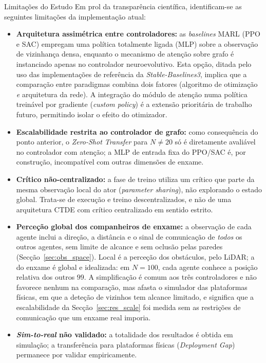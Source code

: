\documentclass[12pt,reqno, twoside]{amsbook}
\makeatletter
\def\section{\@startsection{section}{1}%
      \z@{.5\linespacing\@plus.7\linespacing}{.25\linespacing}%
      {\normalfont\bfseries\flushleft}}
\theoremstyle{plain}
\numberwithin{equation}{chapter}
\numberwithin{section}{chapter}
\numberwithin{table}{chapter}
\numberwithin{figure}{chapter}
\makeatother
\begin{document}
\section{Limitações do Estudo}
\label{sec:limitacoes}
Em prol da transparência científica, identificam-se as seguintes limitações da implementação atual:
\begin{itemize}
    \item \textbf{Arquitetura assimétrica entre controladores:} as \textit{baselines} MARL (PPO e SAC) empregam uma política totalmente ligada (MLP) sobre a observação de vizinhança densa, enquanto o mecanismo de atenção sobre grafo é instanciado apenas no controlador neuroevolutivo. Esta opção, ditada pelo uso das implementações de referência da \textit{Stable-Baselines3}, implica que a comparação entre paradigmas combina dois fatores (algoritmo de otimização \textit{e} arquitetura da rede). A integração do módulo de atenção numa política treinável por gradiente (\textit{custom policy}) é a extensão prioritária de trabalho futuro, permitindo isolar o efeito do otimizador.
    \item \textbf{Escalabilidade restrita ao controlador de grafo:} como consequência do ponto anterior, o \textit{Zero-Shot Transfer} para $N \neq 20$ só é diretamente avaliável no controlador com atenção; a MLP de entrada fixa do PPO/SAC é, por construção, incompatível com outras dimensões de enxame.
    \item \textbf{Crítico não-centralizado:} a fase de treino utiliza um crítico que parte da mesma observação local do ator (\textit{parameter sharing}), não explorando o estado global. Trata-se de execução e treino descentralizados, e não de uma arquitetura CTDE com crítico centralizado em sentido estrito.
    \item \textbf{Perceção global dos companheiros de enxame:} a observação de cada agente inclui a direção, a distância e o sinal de comunicação de \emph{todos} os outros agentes, sem limite de alcance e sem oclusão pelas paredes (Secção~\ref{sec:obs_space}). Local é a perceção dos obstáculos, pelo LiDAR; a do enxame é global e idealizada: em $N=100$, cada agente conhece a posição relativa dos outros $99$. A simplificação é comum aos três controladores e não favorece nenhum na comparação, mas afasta o simulador das plataformas físicas, em que a deteção de vizinhos tem alcance limitado, e significa que a escalabilidade da Secção~\ref{sec:res_scale} foi medida sem as restrições de comunicação que um enxame real imporia.
    \item \textbf{\textit{Sim-to-real} não validado:} a totalidade dos resultados é obtida em simulação; a transferência para plataformas físicas (\textit{Deployment Gap}) permanece por validar empiricamente.

\end{itemize}
\end{document}
